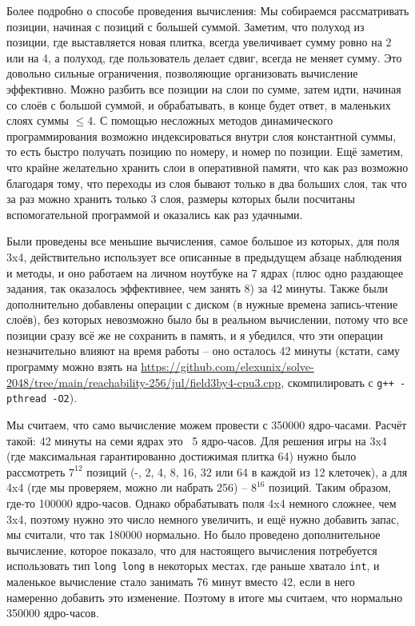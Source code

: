 \documentclass[a4paper,12pt]{article}
\begin{document}
Более подробно о способе проведения вычисления: Мы собираемся рассматривать позиции, начиная с позиций с большей суммой. Заметим, что полуход из позиции, где выставляется новая плитка, всегда увеличивает сумму ровно на 2 или на 4, а полуход, где пользователь делает сдвиг, всегда не меняет сумму. Это довольно сильные ограничения, позволяющие организовать вычисление эффективно. Можно разбить все позиции на слои по сумме, затем идти, начиная со слоёв с большой суммой, и обрабатывать, в конце будет ответ, в маленьких слоях суммы $\leq 4$. С помощью несложных методов динамического программирования возможно индексироваться внутри слоя константной суммы, то есть быстро получать позицию по номеру, и номер по позиции. Ещё заметим, что крайне желательно хранить слои в оперативной памяти, что как раз возможно благодаря тому, что переходы из слоя бывают только в два больших слоя, так что за раз можно хранить только 3 слоя, размеры которых были посчитаны вспомогательной программой и оказались как раз удачными.

Были проведены все меньшие вычисления, самое большое из которых, для поля 3x4, действительно использует все описанные в предыдущем абзаце наблюдения и методы, и оно работаем на личном ноутбуке на 7 ядрах (плюс одно раздающее задания, так оказалось эффективнее, чем занять 8) за 42 минуты. Также были дополнительно добавлены операции с диском (в нужные времена запись-чтение слоёв), без которых невозможно было бы в реальном вычислении, потому что все позиции сразу всё же не сохранить в память, и я убедился, что эти операции незначительно влияют на время работы -- оно осталось 42 минуты (кстати, саму программу можно взять на \url{https://github.com/elexunix/solve-2048/tree/main/reachability-256/jul/field3by4-cpu3.cpp}, скомпилировать с \verb|g++ -pthread -O2|).

Мы считаем, что само вычисление можем провести с 350000 ядро-часами. Расчёт такой: 42 минуты на семи ядрах это ~5 ядро-часов. Для решения игры на 3x4 (где максимальная гарантированно достижимая плитка 64) нужно было рассмотреть $7^{12}$ позиций (-, 2, 4, 8, 16, 32 или 64 в каждой из 12 клеточек), а для 4x4 (где мы проверяем, можно ли набрать 256) -- $8^{16}$ позиций. Таким образом, где-то 100000 ядро-часов. Однако обрабатывать поля 4x4 немного сложнее, чем 3x4, поэтому нужно это число немного увеличить, и ещё нужно добавить запас, мы считали, что так 180000 нормально. Но было проведено дополнительное вычисление, которое показало, что для настоящего вычисления потребуется использовать тип \verb|long long| в некоторых местах, где раньше хватало \verb|int|, и маленькое вычисление стало занимать 76 минут вместо 42, если в него намеренно добавить это изменение. Поэтому в итоге мы считаем, что нормально 350000 ядро-часов.
\end{document}

